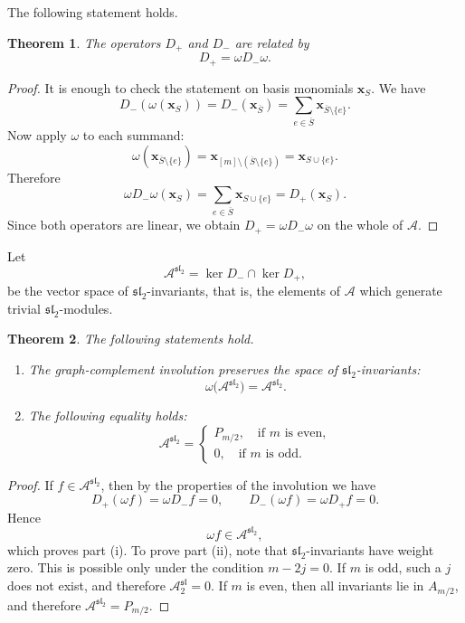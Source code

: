 \documentclass[12pt,reqno]{amsart}
\newtheorem{theorem}{Theorem}[section]
\begin{document}
The following statement holds.
\begin{theorem}
The operators $D_+$ and $D_-$ are related by
$$
D_+=\omega D_-\omega.
$$
\end{theorem}

\begin{proof}
It is enough to check the statement on basis monomials $\boldsymbol{x}_S$.
We have
$$
D_-(\omega(\boldsymbol{x}_S))=D_-(\boldsymbol{x}_{\overline S})
=
\sum_{e\in \overline S}\boldsymbol{x}_{\overline S\setminus\{e\}}.
$$
Now apply $\omega$ to each summand:
$$
\omega\!\left(\boldsymbol{x}_{\overline S\setminus\{e\}}\right)
=
\boldsymbol{x}_{[m]\setminus(\overline S\setminus\{e\})}
=
\boldsymbol{x}_{S\cup\{e\}}.
$$
Therefore
$$
\omega D_-\omega(\boldsymbol{x}_S)
=
\sum_{e\in \overline S}\boldsymbol{x}_{S\cup\{e\}}
=
D_+(\boldsymbol{x}_S).
$$
Since both operators are linear, we obtain
$
D_+=\omega D_-\omega
$
on the whole of $\mathcal A$.
\end{proof}

Let
$$
\mathcal A^{\mathfrak{sl}_2}=\ker D_-\cap \ker D_+,
$$
be the vector space of $\mathfrak{sl}_2$-invariants, that is, the elements of
$\mathcal A$ which generate trivial $\mathfrak{sl}_2$-modules.

\begin{theorem}
The following statements hold.
\begin{enumerate}
\item[\textnormal{(i)}] The graph-complement involution preserves the space of
$\mathfrak{sl}_2$-invariants:
$$
\omega\bigl(\mathcal A^{\mathfrak{sl}_2}\bigr)
=
\mathcal A^{\mathfrak{sl}_2}.
$$

\item[\textnormal{(ii)}]
The following equality holds:
$$
\mathcal A^{\mathfrak{sl}_2}=
\begin{cases}
P_{m/2}, \quad \text{if $m$ is even},\\
0, \quad \text{if $m$ is odd}.
\end{cases}
$$
\end{enumerate}
\end{theorem}

\begin{proof}
If $f\in\mathcal A^{\mathfrak{sl}_2}$, then by the properties of the
involution we have
$$
D_+(\omega f)=\omega D_-f=0,
\qquad
D_-(\omega f)=\omega D_+f=0.
$$
Hence
$$
\omega f\in\mathcal A^{\mathfrak{sl}_2},
$$
which proves part \textnormal{(i)}.
To prove part \textnormal{(ii)}, note that $\mathfrak{sl}_2$-invariants have
weight zero. This is possible only under the condition
$
m-2j=0.
$
If $m$ is odd, such a $j$ does not exist, and therefore
$\mathcal A^\mathfrak{sl}_2=0$.
If $m$ is even, then all invariants lie in $A_{m/2}$, and therefore
$\mathcal A^{\mathfrak{sl}_2}=P_{m/2}$.
\end{proof}
\end{document}
